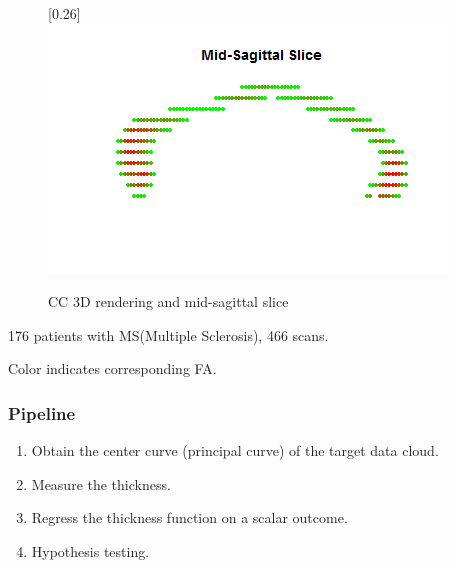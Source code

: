 \documentclass[9 pt]{beamer}
\begin{document}
\begin{frame}
\begin{figure}[ht]
\caption{CC 3D rendering and mid-sagittal slice}
\centering
\begin{minipage}[b]{.45\linewidth}
\centering
{}
\end{minipage}
\begin{minipage}[b]{.45\linewidth}
\hspace{-0.2cm}
\centering
\scalebox{0.35}[0.26]{\includegraphics{pics/corpusA3.png}}
\end{minipage}
\end{figure}
176 patients with MS(Multiple Sclerosis), 466 scans.\

Color indicates corresponding FA.
\end{frame}

\begin{frame}
\frametitle{Pipeline}
\begin{enumerate}
\item Obtain the center curve (principal curve) of the target data cloud.
\item Measure the thickness.
\item Regress the thickness function on a scalar outcome.
\item Hypothesis testing.

\end{enumerate}
\end{frame}
\end{document}
